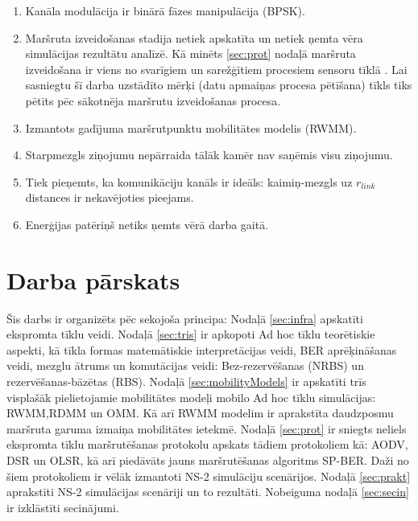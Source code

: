 \begin{enumerate}
  	\item Kanāla modulācija ir  binārā fāzes manipulācija (\acs{BPSK}).
  	\item Maršruta izveidošanas stadija netiek apskatīta un netiek ņemta vēra simulācijas rezultātu analīzē. Kā minēts \ref{sec:prot} nodaļā maršruta izveidošana ir viens no svarīgiem un sarežģītiem procesiem sensoru tīklā \cite{perkinsBook}. Lai sasniegtu šī darba uzstādīto mērķi (datu apmaiņas procesa pētīšana) tīkls tiks pētīts pēc sākotnēja maršrutu izveidošanas procesa.
  	\item Izmantots gadījuma maršrutpunktu mobilitātes modelis (\acs{RWMM}).
  	\item Starpmezgls ziņojumu nepārraida tālāk kamēr nav saņēmis visu ziņojumu.
  	\item Tiek pieņemts, ka komunikāciju kanāls ir ideāls: kaimiņ-mezgls uz $r_{link}$ distances ir nekavējoties pieejams.
	\item Enerģijas patēriņš netiks ņemts vērā darba gaitā.
\end{enumerate}

\section{Darba pārskats}
Šis darbs ir organizēts pēc sekojoša principa: Nodaļā \ref{sec:infra} apskatīti ekspromta tīklu veidi. Nodaļā \ref{sec:tris} ir apkopoti Ad hoc tīklu teorētiskie aspekti, kā tīkla formas matemātiskie interpretācijas veidi, BER aprēķināšanas veidi, mezglu ātrums un komutācijas veidi: Bez-rezervēšanas (\acs{NRBS}) un rezervēšanas-bāzētas (\acs{RBS}). Nodaļā \ref{sec:mobilityModels} ir apskatīti trīs visplašāk pielietojamie mobilitātes modeļi mobilo Ad hoc tīklu simulācijas: \acf{RWMM},\acf{RDMM} un \acf{OMM}. Kā arī \acs{RWMM} modelim ir aprakstīta daudzposmu maršruta garuma izmaiņa mobilitātes ietekmē. Nodaļā \ref{sec:prot} ir sniegts neliels ekspromta tīklu maršrutēšanas protokolu apskats tādiem protokoliem kā: \acf{AODV}, \acf{DSR} un \acf{OLSR}, kā arī piedāvāts jauns maršrutēšanas algoritms SP-BER.  Daži no šiem protokoliem ir vēlāk izmantoti NS-2 simulāciju scenārijos. Nodaļā \ref{sec:prakt} aprakstīti NS-2 simulācijas scenāriji un to rezultāti. Nobeiguma nodaļā \ref{sec:secin} ir izklāstīti secinājumi.